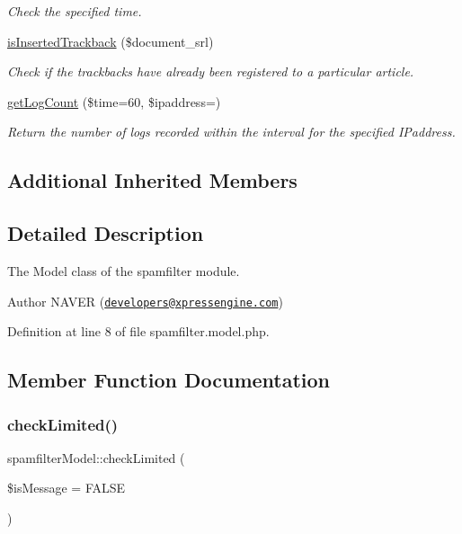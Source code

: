 \begin{DoxyCompactItemize}
\begin{DoxyCompactList}\small\item\em Check the specified time. \end{DoxyCompactList}\item 
\hyperlink{classspamfilterModel_a6b92cb33d6204158cff0baca2d9f3f4b}{is\+Inserted\+Trackback} (\$document\+\_\+srl)
\begin{DoxyCompactList}\small\item\em Check if the trackbacks have already been registered to a particular article. \end{DoxyCompactList}\item 
\hyperlink{classspamfilterModel_a3f46333476c1f3e3feba759dca738288}{get\+Log\+Count} (\$time=60, \$ipaddress=\textquotesingle{}\textquotesingle{})
\begin{DoxyCompactList}\small\item\em Return the number of logs recorded within the interval for the specified I\+Paddress. \end{DoxyCompactList}\end{DoxyCompactItemize}
\subsection*{Additional Inherited Members}


\subsection{Detailed Description}
The Model class of the spamfilter module. 

\begin{DoxyAuthor}{Author}
N\+A\+V\+ER (\href{mailto:developers@xpressengine.com}{\tt developers@xpressengine.\+com}) 
\end{DoxyAuthor}


Definition at line 8 of file spamfilter.\+model.\+php.



\subsection{Member Function Documentation}
\mbox{\label{classspamfilterModel_af681d9fd66de2c4769ebe3880983c689}} 
\subsubsection{\texorpdfstring{check\+Limited()}{checkLimited()}}
{\footnotesize\ttfamily spamfilter\+Model\+::check\+Limited (\begin{DoxyParamCaption}\item[{}]{\$is\+Message = {\ttfamily FALSE} }\end{DoxyParamCaption})}



